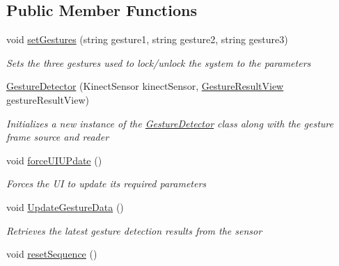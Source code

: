 \subsection*{Public Member Functions}
\begin{DoxyCompactItemize}
\item 
void \hyperlink{class_microsoft_1_1_samples_1_1_kinect_1_1_kinect_security_system_1_1_gesture_detector_a605c6a5ff0f3857d5af4d0548d0a8d50}{set\+Gestures} (string gesture1, string gesture2, string gesture3)
\begin{DoxyCompactList}\small\item\em Sets the three gestures used to lock/unlock the system to the parameters \end{DoxyCompactList}\item 
\hyperlink{class_microsoft_1_1_samples_1_1_kinect_1_1_kinect_security_system_1_1_gesture_detector_ac072ff2ebd85a754b9b1b4e925757d8a}{Gesture\+Detector} (Kinect\+Sensor kinect\+Sensor, \hyperlink{class_microsoft_1_1_samples_1_1_kinect_1_1_kinect_security_system_1_1_gesture_result_view}{Gesture\+Result\+View} gesture\+Result\+View)
\begin{DoxyCompactList}\small\item\em Initializes a new instance of the \hyperlink{class_microsoft_1_1_samples_1_1_kinect_1_1_kinect_security_system_1_1_gesture_detector}{Gesture\+Detector} class along with the gesture frame source and reader \end{DoxyCompactList}\item 
void \hyperlink{class_microsoft_1_1_samples_1_1_kinect_1_1_kinect_security_system_1_1_gesture_detector_a37bfd6d98a0d7ef40a4080115cde2946}{force\+U\+I\+U\+Pdate} ()
\begin{DoxyCompactList}\small\item\em Forces the UI to update it\textquotesingle{}s required parameters \end{DoxyCompactList}\item 
void \hyperlink{class_microsoft_1_1_samples_1_1_kinect_1_1_kinect_security_system_1_1_gesture_detector_aa135be3ffe1a256ce8c19eaff88ef37c}{Update\+Gesture\+Data} ()
\begin{DoxyCompactList}\small\item\em Retrieves the latest gesture detection results from the sensor \end{DoxyCompactList}\item 
void \hyperlink{class_microsoft_1_1_samples_1_1_kinect_1_1_kinect_security_system_1_1_gesture_detector_adc6439369c674bc1a9916f851ca15958}{reset\+Sequence} ()

\end{DoxyCompactItemize}
